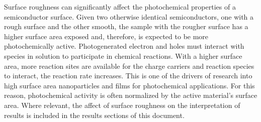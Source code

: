 Surface roughness can significantly affect the photochemical properties of a semiconductor
surface. Given two otherwise identical semiconductors, one with a rough surface and the
other smooth, the sample with the rougher surface has a higher surface area exposed and,
therefore, is expected to be more photochemically active. Photogenerated electron and
holes must interact with species in solution to participate in chemical reactions. With a
higher surface area, more reaction sites are available for the charge carriers and
reaction species to interact, the reaction rate increases. This is one of the drivers of
research into high surface area nanoparticles and films for photochemical
applications.\cite{Kudo:2008fk} For this reason, photochemical activity is often
normalized by the active material's surface area. Where relevant, the affect of surface
roughness on the interpretation of results is included in the results sections of this
document.

%
%
%
%
%
%




